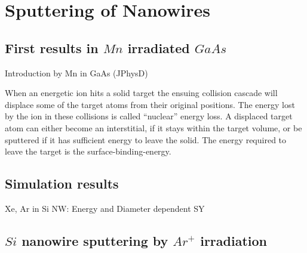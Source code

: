 \chapter{Sputtering of Nanowires}

\section{First results in $Mn$ irradiated $GaAs$}

Introduction by Mn in GaAs (JPhysD)

When an energetic ion hits a solid target the ensuing collision cascade will displace some of the target atoms from their original positions. The energy lost by the ion in these collisions is called ``nuclear'' energy loss. A displaced target atom can either become an interstitial, if it stays within the target volume, or be sputtered if it has sufficient energy to leave the solid. The energy required to leave the target is the surface-binding-energy.

\section{Simulation results}

Xe, Ar in Si NW: Energy and Diameter dependent SY

\section{$Si$ nanowire sputtering by $Ar^+$ irradiation}
